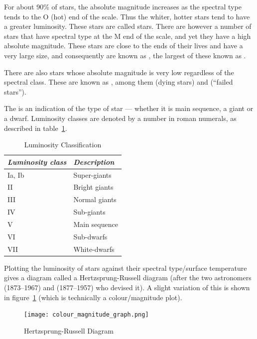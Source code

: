 For about 90\% of stars, the absolute magnitude increases as the
spectral type tends to the O (hot) end of the scale. Thus the whiter,
hotter stars tend to have a greater luminosity. These stars are called
 stars. There are however a number of stars that
have spectral type at the M end of the scale, and yet they have a high
absolute magnitude. These stars are close to the ends of their lives
and have a very large size, and consequently are known as
, the largest of these known as .

There are also stars whose absolute magnitude is very low regardless
of the spectral class. These are known as , among
them  (dying stars) and 
(``failed stars'').

The  is an indication of the type of star ---
whether it is main sequence, a giant or a dwarf. Luminosity classes are
denoted by a number in roman numerals, as described in table~\ref{tab:luminosityclass}.

\begin{table}[tb]
  \centering\small
  \begin{tabular}{ll}
\toprule
\emph{Luminosity class} & \emph{Description}\\\midrule
Ia, Ib & Super-giants\\
II     & Bright giants\\
III    & Normal giants\\
IV     & Sub-giants\\
V      & Main sequence\\
VI     & Sub-dwarfs\\
VII    & White-dwarfs\\
\bottomrule
\end{tabular}
\caption{Luminosity Classification}
\label{tab:luminosityclass}
\end{table}

Plotting the luminosity of stars against their spectral type/surface
temperature gives a diagram called a Hertzsprung-Russell diagram
(after the two astronomers  (1873--1967) and 
 (1877--1957) who devised it). A slight variation of this is shown
in figure~\ref{fig:colourmag} (which is technically a colour/magnitude
plot).

\begin{figure}[tbp]
\centering\texttt{[image: colour\_magnitude\_graph.png]}
\caption{Hertzsprung-Russell Diagram}
\label{fig:colourmag}
\end{figure}

